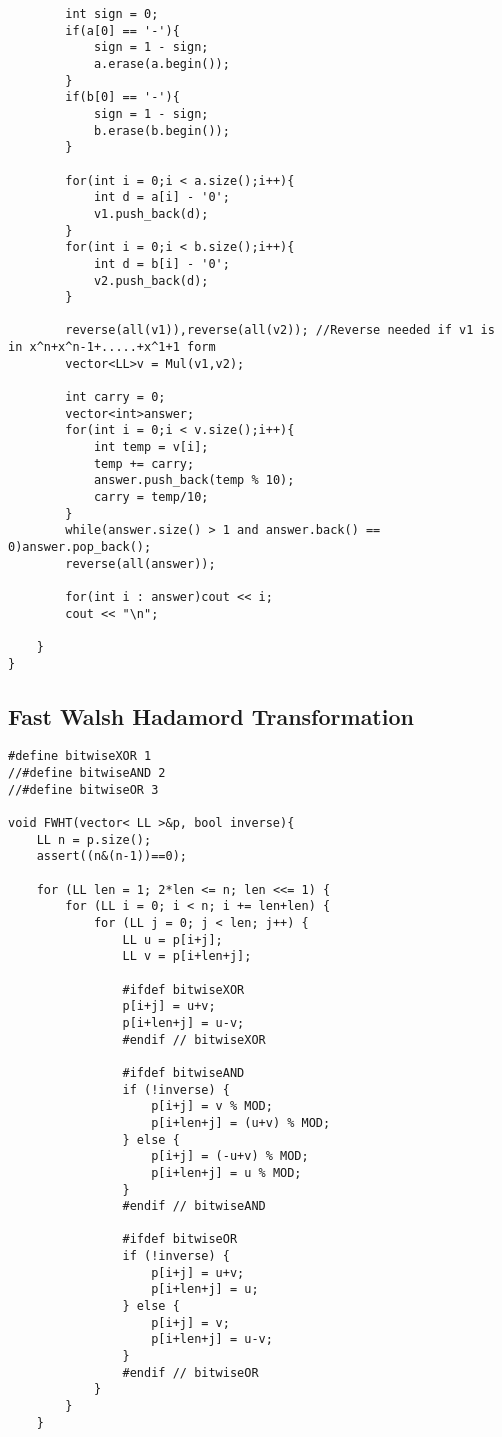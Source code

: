 \documentclass[10pt,a4paper,onesided]{article}
\begin{document}
\begin{multicols*}{3}
\begin{lstlisting}
        int sign = 0;
        if(a[0] == '-'){
            sign = 1 - sign;
            a.erase(a.begin());
        }
        if(b[0] == '-'){
            sign = 1 - sign;
            b.erase(b.begin());
        }

        for(int i = 0;i < a.size();i++){
            int d = a[i] - '0';
            v1.push_back(d);
        }
        for(int i = 0;i < b.size();i++){
            int d = b[i] - '0';
            v2.push_back(d);
        }

        reverse(all(v1)),reverse(all(v2)); //Reverse needed if v1 is in x^n+x^n-1+.....+x^1+1 form
        vector<LL>v = Mul(v1,v2);

        int carry = 0;
        vector<int>answer;
        for(int i = 0;i < v.size();i++){
            int temp = v[i];
            temp += carry;
            answer.push_back(temp % 10);
            carry = temp/10;
        }
        while(answer.size() > 1 and answer.back() == 0)answer.pop_back();
        reverse(all(answer));

        for(int i : answer)cout << i;
        cout << "\n";

    }
}
\end{lstlisting}
\subsection{Fast Walsh Hadamord Transformation}
\begin{lstlisting}
#define bitwiseXOR 1
//#define bitwiseAND 2
//#define bitwiseOR 3

void FWHT(vector< LL >&p, bool inverse){
    LL n = p.size();
    assert((n&(n-1))==0);

    for (LL len = 1; 2*len <= n; len <<= 1) {
        for (LL i = 0; i < n; i += len+len) {
            for (LL j = 0; j < len; j++) {
                LL u = p[i+j];
                LL v = p[i+len+j];

                #ifdef bitwiseXOR
                p[i+j] = u+v;
                p[i+len+j] = u-v;
                #endif // bitwiseXOR

                #ifdef bitwiseAND
                if (!inverse) {
                    p[i+j] = v % MOD;
                    p[i+len+j] = (u+v) % MOD;
                } else {
                    p[i+j] = (-u+v) % MOD;
                    p[i+len+j] = u % MOD;
                }
                #endif // bitwiseAND

                #ifdef bitwiseOR
                if (!inverse) {
                    p[i+j] = u+v;
                    p[i+len+j] = u;
                } else {
                    p[i+j] = v;
                    p[i+len+j] = u-v;
                }
                #endif // bitwiseOR
            }
        }
    }


\end{lstlisting}
\end{multicols*}
\end{document}
